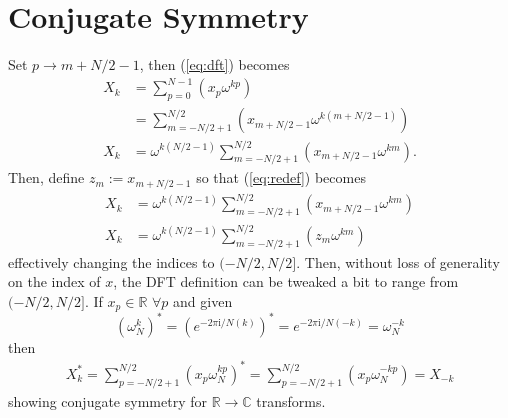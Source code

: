 \documentclass{article}
\begin{document}
\section {Conjugate Symmetry}
%
Set $p \rightarrow m + N/2 - 1$, then (\ref{eq:dft}) becomes
%
\begin {equation} \label {eq:redef}
\begin {aligned}
X_k &= \sum_{p = 0}^{N-1} (x_p \omega^{k p}) \\
    &= \sum_{m = -N/2 + 1}^{N/2} (x_{m + N/2 - 1} \omega^{k (m + N/2 - 1)}) \\
X_k &= \omega^{k (N/2 - 1)} \sum_{m = -N/2 + 1}^{N/2} (x_{m + N/2 - 1} \omega^{k m}).
\end {aligned}
\end {equation}
%
Then, define $z_m := x_{m + N/2 - 1}$ so that (\ref{eq:redef}) becomes
%
\begin {equation}
\begin {aligned}
X_k &= \omega^{k (N/2 - 1)} \sum_{m = -N/2 + 1}^{N/2} (x_{m + N/2 - 1} \omega^{k m}) \\
X_k &= \omega^{k (N/2 - 1)} \sum_{m = -N/2 + 1}^{N/2} (z_m \omega^{k m})
\end {aligned}
\end {equation}
%
effectively changing the indices to $(-N/2, N/2]$.
Then, without loss of generality on the index of $x$, the DFT definition can be tweaked a bit to range from $(-N/2, N/2]$.
If $x_p \in \mathbb {R}$ $\forall p$ and given
%
\begin {equation}
\left (\omega_N^{k} \right)^*
 = \left (e^{-2 \pi \mathrm {i} / N (k)} \right)^* 
 = e^{-2 \pi \mathrm {i} / N (-k)} 
 = \omega_{N}^{-k}
\end {equation}
%
then
%
\begin {equation}
\begin {aligned}
X_k^* = \sum_{p = -N/2+1}^{N/2} (x_p \omega_N^{k p})^*
      = \sum_{p = -N/2+1}^{N/2} (x_p \omega_N^{-k p})
      = X_{-k}
\end {aligned}
\end {equation}
%
showing conjugate symmetry for $\mathbb{R} \rightarrow \mathbb{C}$ transforms.
%
\end{document}
